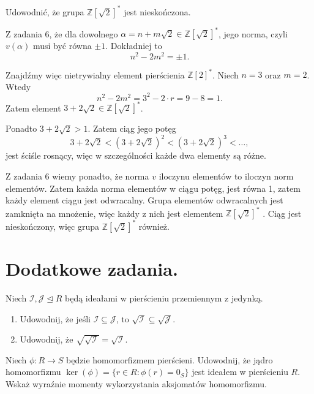 \begin{problem}[9]
	Udowodnić, że grupa $\mathbb{Z} \left[ \sqrt{2}  \right] ^{\ast} $ jest nieskończona.
\end{problem} 
\begin{solution}
	Z zadania 6, że dla dowolnego $\alpha = n+ m\sqrt{2} \in \mathbb{Z} \left[ \sqrt{2}  \right]^{\ast} $, jego norma, czyli $v\left( \alpha  \right) $ musi być równa $\pm 1$. Dokładniej to
	\[
	n^2 -2m^2 = \pm 1
	.\] 

	Znajdźmy więc nietrywialny element pierścienia $\mathbb{Z} \left[ 2 \right] ^{\ast} $. Niech $n=3$ oraz  $m=2$. Wtedy 
	 \[
	n^2 - 2m^2 = 3^2 - 2\cdot \scriptscriptstyle r = 9 - 8 = 1
	.\] 
	Zatem element $3 + 2\sqrt{2} \in \mathbb{Z} \left[ \sqrt{2}  \right] ^{\ast}  $.

	Ponadto $3 + 2\sqrt{2} > 1$. Zatem ciąg jego potęg
	\[
	3 + 2\sqrt{2} < \left( 3 + 2\sqrt{2}  \right) ^2 < \left( 3 + 2\sqrt{2}  \right) ^3 < \ldots
	,\] 
	jest ściśle rosnący, więc w szczególności każde dwa elementy są różne.

	Z zadania 6 wiemy ponadto, że norma $v$ iloczynu elementów to iloczyn norm elementów. Zatem każda norma elementów w ciągu potęg, jest równa 1, zatem każdy element ciągu jest odwracalny. Grupa elementów odwracalnych jest zamknięta na mnożenie, więc każdy z nich jest elementem $\mathbb{Z} \left[ \sqrt{2}  \right] ^{\ast} $ . Ciąg jest nieskończony, więc grupa $\mathbb{Z} \left[ \sqrt{2}  \right] ^{\ast} $ również.
\end{solution} 
\section*{Dodatkowe zadania.}
\begin{problem}
    Niech $\mathcal{I}, \mathcal{J} \trianglelefteq R$ będą ideałami w pierścieniu przemiennym z jedynką.
    \begin{enumerate}
        \item Udowodnij, że jeśli $\mathcal{I} \subseteq \mathcal{J}$, to $\sqrt{\mathcal{I}} \subseteq \sqrt{\mathcal{J}}$.
        \item Udowodnij, że $\sqrt{\sqrt{\mathcal{I}}} = \sqrt{\mathcal{I}}$.
    \end{enumerate}
\end{problem}

\begin{problem}
    Niech $\phi: R \to S$ będzie homomorfizmem pierścieni. Udowodnij, że jądro homomorfizmu $\ker(\phi) = \{r \in R : \phi(r) = 0_S\}$ jest ideałem w pierścieniu $R$. Wskaż wyraźnie momenty wykorzystania aksjomatów homomorfizmu.
\end{problem}

